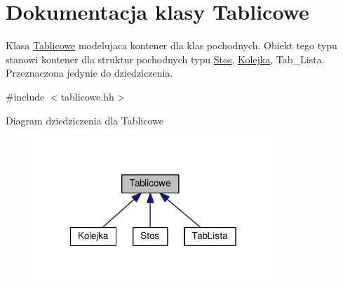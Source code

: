 \hypertarget{class_tablicowe}{\section{Dokumentacja klasy Tablicowe}
\label{class_tablicowe}
}


Klasa \hyperlink{class_tablicowe}{Tablicowe} modelujaca kontener dla klas pochodnych. Obiekt tego typu stanowi kontener dla struktur pochodnych typu \hyperlink{struct_stos}{Stos}, \hyperlink{class_kolejka}{Kolejka}, Tab\-\_\-\-Lista. Przeznaczona jedynie do dziedziczenia.  




{\ttfamily \#include $<$tablicowe.\-hh$>$}



Diagram dziedziczenia dla Tablicowe\nopagebreak
\begin{figure}[H]
\begin{center}
\leavevmode
\includegraphics[width=256pt]{class_tablicowe__inherit__graph}
\end{center}
\end{figure}
